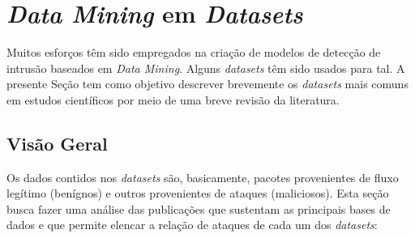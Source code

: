     
    
    
    
    
    










\section{\textit{Data Mining} em \textit{Datasets}} 

\label{sec:datamining}

Muitos esforços têm sido empregados na criação de modelos de detecção de intrusão baseados em \textit{Data Mining}. Alguns \textit{datasets} têm sido usados para tal. A presente Seção tem como objetivo descrever brevemente os \textit{datasets} mais comuns em estudos científicos por meio de uma breve revisão da literatura. 

\subsection{Visão Geral}
Os dados contidos nos \textit{datasets} são, basicamente, pacotes provenientes de fluxo legítimo (benígnos) e outros provenientes de ataques (maliciosos). Esta seção busca fazer uma análise das publicações que sustentam as principais bases de dados e que permite elencar a relação de ataques de cada um dos \textit{datasets}:


